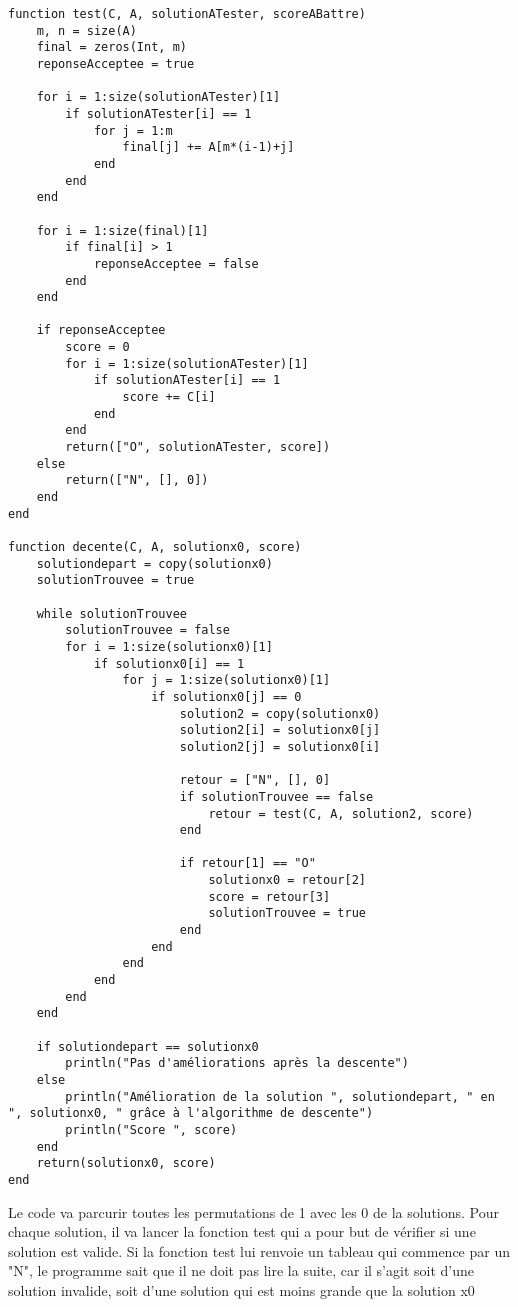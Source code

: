 \begin{lstlisting}
function test(C, A, solutionATester, scoreABattre)
    m, n = size(A)
    final = zeros(Int, m)
    reponseAcceptee = true

    for i = 1:size(solutionATester)[1]
        if solutionATester[i] == 1
            for j = 1:m
                final[j] += A[m*(i-1)+j]
            end
        end
    end

    for i = 1:size(final)[1]
        if final[i] > 1
            reponseAcceptee = false
        end
    end

    if reponseAcceptee
        score = 0
        for i = 1:size(solutionATester)[1]
            if solutionATester[i] == 1
                score += C[i]
            end
        end
        return(["O", solutionATester, score])
    else
        return(["N", [], 0])
    end
end

function decente(C, A, solutionx0, score)
    solutiondepart = copy(solutionx0)
    solutionTrouvee = true

    while solutionTrouvee
        solutionTrouvee = false
        for i = 1:size(solutionx0)[1]
            if solutionx0[i] == 1
                for j = 1:size(solutionx0)[1]
                    if solutionx0[j] == 0
                        solution2 = copy(solutionx0)
                        solution2[i] = solutionx0[j]
                        solution2[j] = solutionx0[i]

                        retour = ["N", [], 0]
                        if solutionTrouvee == false
                            retour = test(C, A, solution2, score)
                        end

                        if retour[1] == "O"
                            solutionx0 = retour[2]
                            score = retour[3]
                            solutionTrouvee = true
                        end
                    end
                end
            end
        end
    end

    if solutiondepart == solutionx0
        println("Pas d'améliorations après la descente")
    else
        println("Amélioration de la solution ", solutiondepart, " en ", solutionx0, " grâce à l'algorithme de descente")
        println("Score ", score)
    end
    return(solutionx0, score)
end
\end{lstlisting}

\vspace{5mm}
\noindent
Le code va parcurir toutes les permutations de 1 avec les 0 de la solutions. Pour chaque solution, il va lancer la fonction test qui a pour but de vérifier si une solution est valide. Si la fonction test lui renvoie un tableau qui commence par un "N", le programme sait que il ne doit pas lire la suite, car il s'agit soit d'une solution invalide, soit d'une solution qui est moins grande que la solution x0

